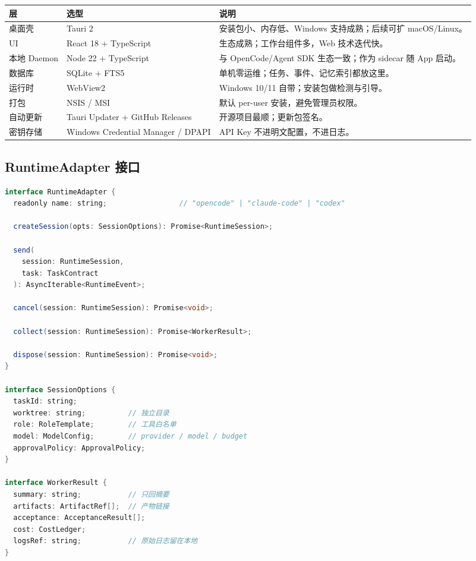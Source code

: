 \documentclass[UTF8,11pt,a4paper,fontset=windows]{ctexart}
\let\ocsubsection\subsection
\renewcommand{\subsection}{\Needspace{5\baselineskip}\ocsubsection}
\begin{document}
\noindent\begin{minipage}{\linewidth}
\centering
{}
\small
\begin{tabularx}{\linewidth}{@{}p{3.0cm} p{4.0cm} X@{}}
\toprule
\textbf{层} & \textbf{选型} & \textbf{说明} \\
\midrule
桌面壳 & Tauri 2 & 安装包小、内存低、Windows 支持成熟；后续可扩 macOS/Linux。 \\
UI & React 18 + TypeScript & 生态成熟；工作台组件多，Web 技术迭代快。 \\
本地 Daemon & Node 22 + TypeScript & 与 OpenCode/Agent SDK 生态一致；作为 sidecar 随 App 启动。 \\
数据库 & SQLite + FTS5 & 单机零运维；任务、事件、记忆索引都放这里。 \\
运行时 & WebView2 & Windows 10/11 自带；安装包做检测与引导。 \\
打包 & NSIS / MSI & 默认 per-user 安装，避免管理员权限。 \\
自动更新 & Tauri Updater + GitHub Releases & 开源项目最顺；更新包签名。 \\
密钥存储 & Windows Credential Manager / DPAPI & API Key 不进明文配置，不进日志。 \\
\bottomrule
\end{tabularx}
\end{minipage}

\subsection{RuntimeAdapter 接口}

\begin{lstlisting}[language=Java,caption={RuntimeAdapter 接口（TypeScript 伪代码）},label={lst:adapter}]
interface RuntimeAdapter {
  readonly name: string;                 // "opencode" | "claude-code" | "codex"

  createSession(opts: SessionOptions): Promise<RuntimeSession>;

  send(
    session: RuntimeSession,
    task: TaskContract
  ): AsyncIterable<RuntimeEvent>;

  cancel(session: RuntimeSession): Promise<void>;

  collect(session: RuntimeSession): Promise<WorkerResult>;

  dispose(session: RuntimeSession): Promise<void>;
}

interface SessionOptions {
  taskId: string;
  worktree: string;          // 独立目录
  role: RoleTemplate;        // 工具白名单
  model: ModelConfig;        // provider / model / budget
  approvalPolicy: ApprovalPolicy;
}

interface WorkerResult {
  summary: string;           // 只回摘要
  artifacts: ArtifactRef[];  // 产物链接
  acceptance: AcceptanceResult[];
  cost: CostLedger;
  logsRef: string;           // 原始日志留在本地
}
\end{lstlisting}
\end{document}

